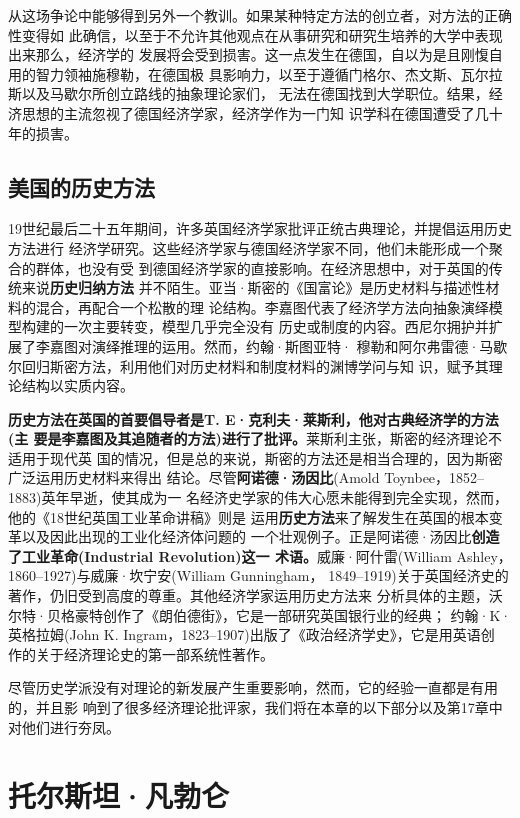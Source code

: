 从这场争论中能够得到另外一个教训。如果某种特定方法的创立者，对方法的正确性变得如
此确信，以至于不允许其他观点在从事研究和研究生培养的大学中表现出来那么，经济学的
发展将会受到损害。这一点发生在德国，自以为是且刚愎自用的智力领袖施穆勒，在德国极
具影响力，以至于遵循门格尔、杰文斯、瓦尔拉斯以及马歇尔所创立路线的抽象理论家们，
无法在德国找到大学职位。结果，经济思想的主流忽视了德国经济学家，经济学作为一门知
识学科在德国遭受了几十年的损害。

\subsection{美国的历史方法}

19世纪最后二十五年期间，许多英国经济学家批评正统古典理论，并提倡运用历史方法进行
经济学研究。这些经济学家与德国经济学家不同，他们未能形成一个聚合的群体，也没有受
到德国经济学家的直接影响。在经济思想中，对于英国的传统来说\textbf{历史归纳方法}
并不陌生。亚当·斯密的《国富论》是历史材料与描述性材料的混合，再配合一个松散的理
论结构。李嘉图代表了经济学方法向抽象演绎模型构建的一次主要转变，模型几乎完全没有
历史或制度的内容。西尼尔拥护并扩展了李嘉图对演绎推理的运用。然而，约翰·斯图亚特·
穆勒和阿尔弗雷德·马歇尔回归斯密方法，利用他们对历史材料和制度材料的渊博学问与知
识，赋予其理论结构以实质内容。

\textbf{历史方法在英国的首要倡导者是T. E·克利夫·莱斯利，他对古典经济学的方法(主
要是李嘉图及其追随者的方法)进行了批评。}莱斯利主张，斯密的经济理论不适用于现代英
国的情况，但是总的来说，斯密的方法还是相当合理的，因为斯密广泛运用历史材料来得出
结论。尽管\textbf{阿诺德·汤因比}(Amold Toynbee，1852--1883)英年早逝，使其成为一
名经济史学家的伟大心愿未能得到完全实现，然而，他的《18世纪英国工业革命讲稿》则是
运用\textbf{历史方法}来了解发生在英国的根本变革以及因此出现的工业化经济体问题的
一个壮观例子。正是阿诺德·汤因比\textbf{创造了工业革命(Industrial Revolution)这一
术语。}威廉·阿什雷(William Ashley，1860--1927)与威廉·坎宁安(William Gunningham，
1849--1919)关于英国经济史的著作，仍旧受到高度的尊重。其他经济学家运用历史方法来
分析具体的主题，沃尔特·贝格豪特创作了《朗伯德街》，它是一部研究英国银行业的经典；
约翰·K·英格拉姆(John K. Ingram，1823--1907)出版了《政治经济学史》，它是用英语创
作的关于经济理论史的第一部系统性著作。

尽管历史学派没有对理论的新发展产生重要影响，然而，它的经验一直都是有用的，并且影
响到了很多经济理论批评家，我们将在本章的以下部分以及第17章中对他们进行夯凤。

\section{托尔斯坦·凡勃仑}

